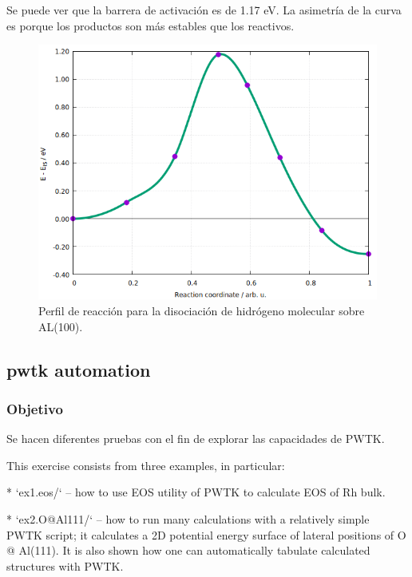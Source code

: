   Se puede ver que la barrera de activación es de 1.17 eV. La asimetría de la curva es porque los productos son más estables que los reactivos.

   \begin{figure}[H]
       \centering
        \includegraphics[scale = 0.45]{figs/D3/diss.png}
        \caption{Perfil de reacción para la disociación de hidrógeno molecular sobre AL(100).}
    \end{figure}

\subsection{pwtk automation}

\subsubsection{Objetivo}

  Se hacen diferentes pruebas con el fin de explorar las capacidades de PWTK.


This exercise consists from three examples, in particular:

* `ex1.eos/` -- how to use EOS utility of PWTK to calculate EOS of Rh bulk.

* `ex2.O@Al111/` -- how to run many calculations with a relatively
                    simple PWTK script; it calculates a 2D potential
                    energy surface of lateral positions of O @ Al(111).
                    It is also shown how one can automatically
                    tabulate calculated structures with PWTK.


